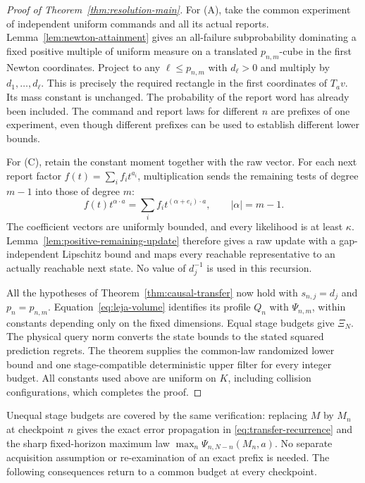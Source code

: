 \documentclass[11pt]{amsart}
\theoremstyle{definition}\newtheorem{definition}[theorem]{Definition}
\theoremstyle{remark}\newtheorem{remark}[theorem]{Remark}
\begin{document}
\begin{proof}[Proof of Theorem~\ref{thm:resolution-main}]
For (A), take the common experiment of independent uniform commands and
all its actual reports. Lemma~\ref{lem:newton-attainment} gives an
all-failure subprobability dominating a fixed positive multiple of
uniform measure on a translated $p_{n,m}$-cube in the first Newton
coordinates. Project to any $\ell\le p_{n,m}$ with $d_\ell>0$
and multiply by $d_1,\ldots,d_\ell$. This is precisely the required
rectangle in the first coordinates of $T_av$. Its mass constant is
unchanged. The probability of the report word has already been
included. The command and report laws for different $n$ are prefixes
of one experiment, even though different prefixes can be used to
establish different lower bounds.

For (C), retain the constant moment together with the raw vector.
For each next report factor $f(t)=\sum_i f_i t^{a_i}$, multiplication
sends the remaining tests of degree $m-1$ into those of degree $m$:
\[
 f(t)t^{\alpha\cdot a}=\sum_i f_i t^{(\alpha+e_i)\cdot a},
 \qquad |\alpha|=m-1.
\]
The coefficient vectors are uniformly bounded, and every likelihood
is at least $\kappa$. Lemma~\ref{lem:positive-remaining-update}
therefore gives a raw update with a gap-independent Lipschitz bound
and maps every reachable representative to an actually reachable next
state. No value of $d_j^{-1}$ is used in this recursion.

All the hypotheses of Theorem~\ref{thm:causal-transfer} now hold with
$s_{n,j}=d_j$ and $p_n=p_{n,m}$. Equation~\eqref{eq:leja-volume}
identifies its profile $Q_n$ with $\Psi_{n,m}$, within constants
depending only on the fixed dimensions. Equal stage budgets give
$\Xi_N$. The physical query norm converts the state bounds to the
stated squared prediction regrets. The theorem supplies the common-law
randomized lower bound and one stage-compatible deterministic upper
filter for every integer budget. All constants used above are uniform
on $K$, including collision configurations, which completes the proof.
\end{proof}

Unequal stage budgets are covered by the same verification: replacing
$M$ by $M_n$ at checkpoint $n$ gives the exact error propagation in
\eqref{eq:transfer-recurrence} and the sharp fixed-horizon maximum law
$\max_n\Psi_{n,N-n}(M_n,a)$. No separate acquisition assumption or
re-examination of an exact prefix is needed. The following consequences
return to a common budget at every checkpoint.
\end{document}
